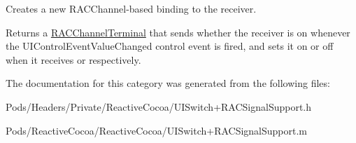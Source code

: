 Creates a new R\+A\+C\+Channel-\/based binding to the receiver.

Returns a \mbox{\hyperlink{interface_r_a_c_channel_terminal}{R\+A\+C\+Channel\+Terminal}} that sends whether the receiver is on whenever the U\+I\+Control\+Event\+Value\+Changed control event is fired, and sets it on or off when it receives  or  respectively. 

The documentation for this category was generated from the following files\+:\begin{DoxyCompactItemize}
\item 
Pods/\+Headers/\+Private/\+Reactive\+Cocoa/U\+I\+Switch+\+R\+A\+C\+Signal\+Support.\+h\item 
Pods/\+Reactive\+Cocoa/\+Reactive\+Cocoa/U\+I\+Switch+\+R\+A\+C\+Signal\+Support.\+m\end{DoxyCompactItemize}
